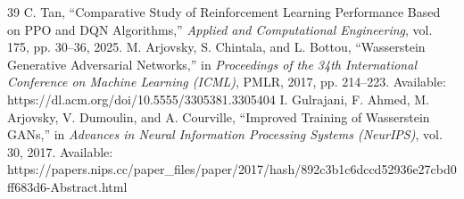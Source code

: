 \documentclass[conference]{IEEEtran}
\begin{document}
\begin{thebibliography}{39}
 C. Tan, ``Comparative Study of Reinforcement Learning Performance Based on PPO and DQN Algorithms,'' \emph{Applied and Computational Engineering}, vol. 175, pp. 30--36, 2025.
 M. Arjovsky, S. Chintala, and L. Bottou, ``Wasserstein Generative Adversarial Networks,'' in \emph{Proceedings of the 34th International Conference on Machine Learning (ICML)}, PMLR, 2017, pp. 214--223. Available: https://dl.acm.org/doi/10.5555/3305381.3305404
 I. Gulrajani, F. Ahmed, M. Arjovsky, V. Dumoulin, and A. Courville, ``Improved Training of Wasserstein GANs,'' in \emph{Advances in Neural Information Processing Systems (NeurIPS)}, vol. 30, 2017. Available: https://papers.nips.cc/paper\_files/paper/2017/hash/892c3b1c6dccd52936e27cbd0ff683d6-Abstract.html

~
\end{thebibliography}
\end{document}
